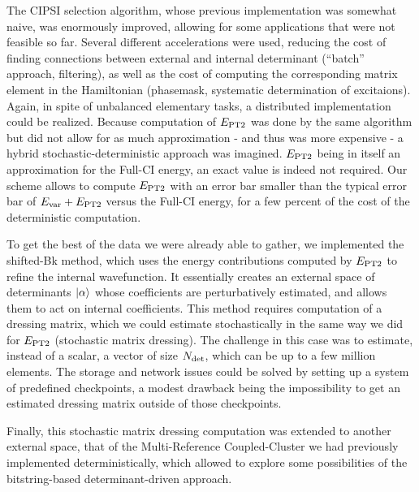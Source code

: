 \documentclass[12pt,a4paper]{report}
\begin{document}
The CIPSI selection algorithm, whose previous implementation was somewhat naive, was enormously improved, allowing for some applications that were not feasible so far\cite{Scemama_2018,1806.05115}. Several different accelerations were used, reducing the cost of finding connections between external and internal determinant (``batch'' approach, filtering), as well as the cost of computing the corresponding matrix element in the Hamiltonian (phasemask, systematic determination of excitaions). Again, in spite of unbalanced elementary tasks, a distributed implementation could be realized.
Because computation of $E_\text{PT2}$ was done by the same algorithm but did not allow for as much approximation - and thus was more expensive - a hybrid stochastic-deterministic approach was imagined. $E_\text{PT2}$ being in itself an approximation for the Full-CI energy, an exact value is indeed not required. Our scheme allows to compute $E_\text{PT2}$ with an error bar smaller than the typical error bar of $E_{\text{var}} + E_\text{PT2}$ versus the Full-CI energy, for a few percent of the cost of the deterministic computation.

To get the best of the data we were already able to gather, we implemented the shifted-Bk method, which uses the energy contributions computed by $E_\text{PT2}$ to refine the internal wavefunction. It essentially creates an external space of determinants ${\ket{\alpha}}$ whose coefficients are perturbatively estimated, and allows them to act on internal coefficients. This method requires computation of a dressing matrix, which we could estimate stochastically in the same way we did for $E_\text{PT2}$ (stochastic matrix dressing).
The challenge in this case was to estimate, instead of a scalar, a vector of size ${N_\text{det}}$, which can be up to a few million elements. The storage and network issues could be solved by setting up a system of predefined checkpoints, a modest drawback being the impossibility to get an estimated dressing matrix outside of those checkpoints.

Finally, this stochastic matrix dressing computation was extended to another external space, that of the Multi-Reference Coupled-Cluster we had previously implemented deterministically,\cite{Garniron_2017} which allowed to explore some possibilities of the bitstring-based determinant-driven approach.



\end{document}
